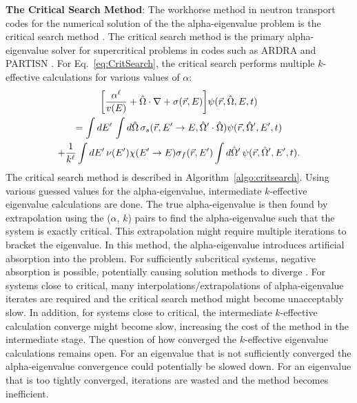 \textbf{The Critical Search Method}: The workhorse method in neutron transport codes for the numerical solution of the the alpha-eigenvalue problem is the critical search method \cite{hill_efficient_1983}. The critical search method is the primary alpha-eigenvalue solver for supercritical problems in codes such as ARDRA \cite{hanebutte_ardra_1999} and PARTISN \cite{alcouffe2005partisn}. For Eq.~\ref{eq:CritSearch}, the critical search performs multiple $k$-effective calculations for various values of $\alpha$:
\begin{multline}
	\bigg [ \frac{\alpha^{\ell}}{v(E)}  + \hat{\Omega} \cdot \nabla + \sigma(\vec{r},E) \bigg ] \psi(\vec{r},\hat{\Omega},E,t) \\ = \int \mathop{}\!d E' \, \int \mathop{}\!d \hat{\Omega} \, \sigma_{s}(\vec{r},E'\rightarrow E,\hat{\Omega}' \cdot \hat{\Omega}) \psi(\vec{r},\hat{\Omega}',E',t) \\ + \frac{1}{k^{\ell}}\int \mathop{}\!d E' \, \nu(E') \chi(E'\rightarrow E) \sigma_{f}(\vec{r},E') \int \mathop{}\!d \hat{\Omega}' \, \psi(\vec{r},\hat{\Omega}',E',t). 
	\label{eq:CritSearch}
\end{multline}
The critical search method is described in Algorithm~\ref{algo:critsearch}. Using various guessed values for the alpha-eigenvalue, intermediate $k$-effective eigenvalue calculations are done. The true alpha-eigenvalue is then found by extrapolation using the ($\alpha$, $k$) pairs to find the alpha-eigenvalue such that the system is exactly critical. This extrapolation might require multiple iterations to bracket the eigenvalue. In this method, the alpha-eigenvalue introduces artificial absorption into the problem. For sufficiently subcritical systems, negative absorption is possible, potentially causing solution methods to diverge \cite{hill_efficient_1983}. For systems close to critical, many interpolations/extrapolations of alpha-eigenvalue iterates are required and the critical search method might become unacceptably slow. In addition, for systems close to critical, the intermediate $k$-effective calculation converge might become slow, increasing the cost of the method in the intermediate stage. The question of how converged the $k$-effective eigenvalue calculations remains open. For an eigenvalue that is not sufficiently converged the alpha-eigenvalue convergence could potentially be slowed down. For an eigenvalue that is too tightly converged, iterations are wasted and the method becomes inefficient.

